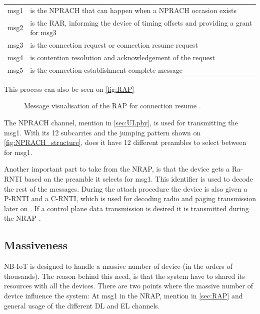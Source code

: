 \begin{tabular}{ll}
msg1 & is the NPRACH that can happen when a NPRACH occasion exists \\
msg2 & is the \gls{RAR}, informing the device of timing offsets and providing a grant for msg3 \\
msg3 & is the connection request or connection resume request \\
msg4 & is contention resolution and acknowledgement of the request \\
msg5 & is the connection establishment complete message\\
\end{tabular}

This process can also be seen on \autoref{fig:RAP}


\begin{figure}[H]
\centering

\caption{Message visualisation of the \gls{RAP} for connection resume \citep{NB-IoT_Book}.}
\label{fig:RAP}
\end{figure}

The NPRACH channel, mention in \autoref{sec:ULphy}, is used for transmitting the msg1. With its 12 subcarries and the jumping pattern shown on \autoref{fig:NPRACH_structure}, does it have 12 different preambles to select between for msg1.

Another important part to take from the \gls{NRAP}, is that the device gets a \gls{Ra-RNTI} based on the preamble it selects for msg1. This identifier is used to decode the rest of the messages. During the attach procedure the device is also given a \gls{P-RNTI} and a \gls{C-RNTI}, which is used for decoding radio and paging transmission later on \citep{whitepaper}. If a control plane data transmission is desired it is transmitted during the \gls{NRAP} \citep{primer}.

\subsection{Massiveness}
NB-IoT is designed to handle a massive number of device (in the orders of thousands). The reason behind this need, is that the system have to shared its resources with all the devices. There are two points where the massive number of device influence the system: At msg1 in the NRAP, mention in \autoref{sec:RAP} and general usage of the different DL and EL channels.

